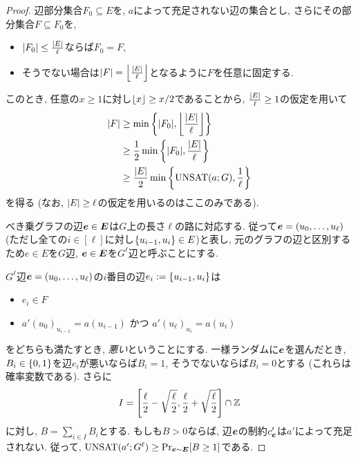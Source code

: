 \begin{proof}
辺部分集合$F_0\subseteq E$を, $a$によって充足されない辺の集合とし,
さらにその部分集合$F\subseteq F_0$を, 
\begin{itemize}
\item $\abs{F_0} \le \frac{\abs{E}}{\ell}$ならば$F_0=F$,
\item そうでない場合は$\abs{F} = \floor*{\frac{\abs{E}}{\ell}}$となるように$F$を任意に固定する.
\end{itemize}
このとき, 任意の$x\ge 1$に対し$\floor{x}\ge x/2$であることから, $\frac{\abs{E}}{\ell}\ge 1$の仮定を用いて
\begin{align}
  \abs{F} &\ge \min\qty{ \abs{F_0}, \floor*{\frac{\abs{E}}{\ell}} } \nonumber \\
  &\ge \frac{1}{2}\min\qty{ \abs{F_0}, \frac{\abs{E}}{\ell} } \nonumber \\
  &\ge \frac{\abs{E}}{2}\min\qty{ \UNSAT(a;G), \frac{1}{\ell} } \label{eq:abs-F}
\end{align}
を得る (なお, $\abs{E}\ge \ell$の仮定を用いるのはここのみである).

べき乗グラフの辺$\bolde \in \boldE$は$G$上の長さ$\ell$の路に対応する.
従って$\bolde = (u_0,\dots,u_\ell)$ (ただし全ての$i\in[\ell]$に対し$\qty{u_{i-1},u_{i}}\in E$)と表し, 元のグラフの辺と区別するため$e\in E$を$G$辺, $\bolde\in\boldE$を$G^\ell$辺と呼ぶことにする.

$G^\ell$辺$\bolde=(u_0,\dots,u_\ell)$の$i$番目の辺$e_i:=\qty{u_{i-1},u_i}$は
\begin{itemize}
  \item $e_i \in F$
  \item $a'(u_{0})_{u_{i-1}} = a(u_{i-1})$ かつ $a'(u_\ell)_{u_i} = a(u_i)$
\end{itemize}
をどちらも満たすとき, \emph{悪い}ということにする.
一様ランダムに$\bolde$を選んだとき, $B_i\in\binset$を辺$e_i$が悪いならば$B_i=1$, そうでないならば$B_i=0$とする (これらは確率変数である).
さらに
\begin{align*}
  I = \qty[\frac{\ell}{2} - \sqrt{\frac{\ell}{2}}, \frac{\ell}{2} + \sqrt{\frac{\ell}{2}}] \cap \mathbb{Z}
\end{align*}
に対し, $B=\sum_{i\in I}B_i$とする.
もしも$B>0$ならば, 辺$\bolde$の制約$c'_{\bolde}$は$a'$によって充足されない.
従って, $\UNSAT(a';G^\ell) \ge \Pr_{\bolde\sim \boldE}[B\ge 1]$である.


\end{proof}
